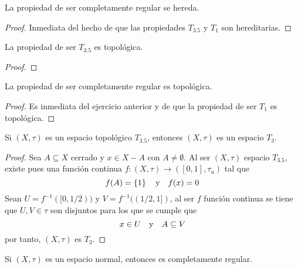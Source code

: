 \documentclass[12pt]{report}
\theoremstyle{largebreak}
\newcommand\cf[3]{\ensuremath{#1:#2\rightarrow#3}}
\begin{document}
    \begin{cor}
        La propiedad de ser completamente regular se hereda.
    \end{cor}

    \begin{proof}
        Inmediata del hecho de que las propiedades $T_{3.5}$ y $T_1$ son hereditarias.
    \end{proof}

    \begin{excer}
        La propiedad de ser $T_{3.5}$ es topológica.
    \end{excer}

    \begin{proof}
        
    \end{proof}

    \begin{cor}
        La propiedad de ser completamente regular es topológica.
    \end{cor}

    \begin{proof}
        Es inmediata del ejercicio anterior y de que la propiedad de ser $T_1$ es topológica.
    \end{proof}

    \begin{propo}
        Si $(X,\tau)$ es un espacio topológico $T_{3.5}$, entonces $(X,\tau)$ es un espacio $T_3$.
    \end{propo}

    \begin{proof}
        Sea $A\subseteq X$ cerrado y $x\in X-A$ con $A\neq\emptyset$. Al ser $(X,\tau)$ espacio $T_{3.5}$, existe pues una función continua $\cf{f}{(X,\tau)}{([0,1],\tau_u)}$ tal que
        \begin{equation*}
            f(A)=\left\{1 \right\}\quad\textup{y}\quad f(x)=0
        \end{equation*}
        Sean $U=f^{-1}([0,1/2))$ y $V=f^{-1}((1/2,1])$, al ser $f$ función continua se tiene que $U,V\in\tau$ son disjuntos para los que se cumple que
        \begin{equation*}
            x\in U\quad\textup{y}\quad A\subseteq V
        \end{equation*}
        por tanto, $(X,\tau)$ es $T_3$.
    \end{proof}

    \begin{propo}
        Si $(X,\tau)$ es un espacio normal, entonces es completamente regular.
    \end{propo}
\end{document}

